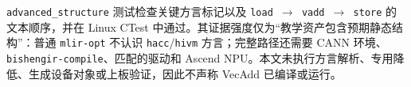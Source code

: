 \texttt{advanced\_structure} 测试检查关键方言标记以及 \texttt{load $\rightarrow$ vadd $\rightarrow$ store} 的文本顺序，并在 Linux CTest 中通过。其证据强度仅为“教学资产包含预期静态结构”：普通 \texttt{mlir-opt} 不认识 \texttt{hacc}/\texttt{hivm} 方言；完整路径还需要 CANN 环境、\texttt{bishengir-compile}、匹配的驱动和 Ascend NPU。本文未执行方言解析、专用降低、生成设备对象或上板验证，因此不声称 VecAdd 已编译或运行。
